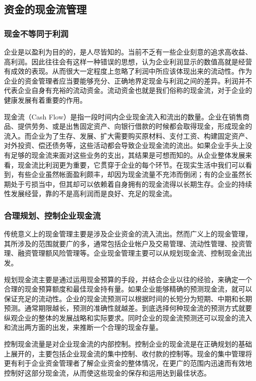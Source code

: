 \subsection {资金的现金流管理}

\subsubsection {现金不等同于利润}

    企业是以盈利为目的的，是人尽皆知的。当前不乏有一些企业刻意的追求高收益、高利润。因此往往会有这样一种错误的思想，认为企业利润显示的数值高就是经营有成效的表现。从而很大一定程度上忽略了利润中所应该体现出来的流动性。作为企业的资金管理者应当要能够充分、正确地界定现金与利润之间的差异。利润并不代表企业自身有充裕的流动资金。流动资金也就是我们俗称的现金流，对于企业的健康发展有着重要的作用。

    现金流（Cash Flow）是指一段时间内企业现金流入和流出的数量。企业在销售商品、提供劳务、或是出售固定资产、向银行借款的时候都会取得现金，形成现金的流入。而企业为了生存、发展、扩大需要购买原材料、支付工资、构建固定资产、对外投资、偿还债务等，这些活动都会导致企业现金流的流出。如果企业手头上没有足够的现金流来面对这些业务的支出，其结果是可想而知的。从企业整体发展来看，现金流比利润更为重要，它贯穿于企业的每个环节。在现实生活中我们可以看到，有些企业虽然帐面盈利颇丰，却因为现金流量不充沛而倒闭；有的企业虽然长期处于亏损当中，但其却可以依赖着自身拥有的现金流得以长期生存。企业的持续性发展经营，靠的不是高利润而是良好、充足的现金流。

\subsubsection {合理规划、控制企业现金流}

    传统意义上的现金管理主要是涉及企业资金的流入流出。然而广义上的现金管理，其所涉及的范围就要广的多，通常包括企业帐户及交易管理、流动性管理、投资管理、融资管理额风险管理等。企业现金管理主要可以从规划现金流、控制现金流出发。

    规划现金流主要是通过运用现金预算的手段，并结合企业以往的经验，来确定一个合理的现金预算额度和最佳现金持有量。如果企业能够精确的预测现金流，就可以保证充足的流动性。企业的现金流预测可以根据时间的长短分为短期、中期和长期预测。通常期限越长，预测的准确性就越差。到底选择何种现金流的预测方式就要纵观企业的整体的发展战略和实际要求。同时企业的现金流预测还可以现金的流入和流出两方面的出发，来推断一个合理的现金存量。

    控制现金流量是对企业现金流的内部控制。控制企业的现金流是在正确规划的基础上展开的，主要包括企业现金流的集中控制、收付款的控制等。现金的集中管理将更有利于企业资金管理者了解企业资金的整体情况，在更广的范围内迅速而有效地控制好这部分现金流，从而使这些现金的保存和运用达到最佳状态。
